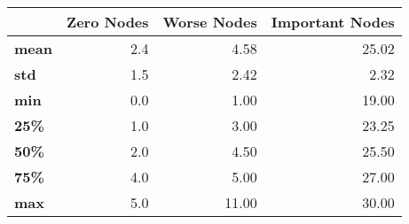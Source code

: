 \begin{tabular}{lrrr}
\toprule
{} &  Zero Nodes &  Worse Nodes &  Important Nodes \\
\midrule
\textbf{mean} &         2.4 &         4.58 &            25.02 \\
\textbf{std } &         1.5 &         2.42 &             2.32 \\
\textbf{min } &         0.0 &         1.00 &            19.00 \\
\textbf{25\% } &         1.0 &         3.00 &            23.25 \\
\textbf{50\% } &         2.0 &         4.50 &            25.50 \\
\textbf{75\% } &         4.0 &         5.00 &            27.00 \\
\textbf{max } &         5.0 &        11.00 &            30.00 \\
\bottomrule
\end{tabular}
